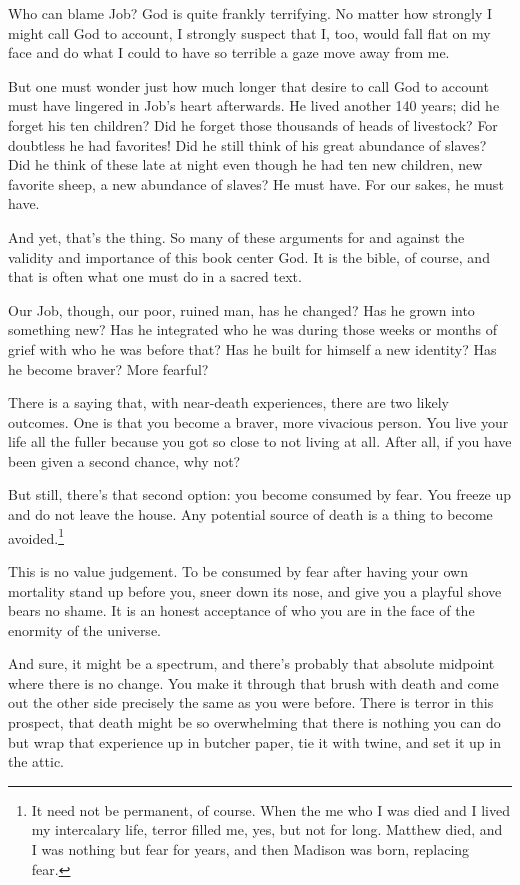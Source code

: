 Who can blame Job? God is quite frankly terrifying. No matter how strongly I might call God to account, I strongly suspect that I, too, would fall flat on my face and do what I could to have so terrible a gaze move away from me.

But one must wonder just how much longer that desire to call God to account must have lingered in Job's heart afterwards. He lived another 140 years; did he forget his ten children? Did he forget those thousands of heads of livestock? For doubtless he had favorites! Did he still think of his great abundance of slaves? Did he think of these late at night even though he had ten new children, new favorite sheep, a new abundance of slaves? He must have. For our sakes, he must have.

And yet, that's the thing. So many of these arguments for and against the validity and importance of this book center God. It is the bible, of course, and that is often what one must do in a sacred text.

Our Job, though, our poor, ruined man, has he changed? Has he grown into something new? Has he integrated who he was during those weeks or months of grief with who he was before that? Has he built for himself a new identity? Has he become braver? More fearful?

There is a saying that, with near-death experiences, there are two likely outcomes. One is that you become a braver, more vivacious person. You live your life all the fuller because you got so close to not living at all. After all, if you have been given a second chance, why not?

But still, there's that second option: you become consumed by fear. You freeze up and do not leave the house. Any potential source of death is a thing to become avoided.\footnote{It need not be permanent, of course. When the me who I was died and I lived my intercalary life, terror filled me, yes, but not for long. Matthew died, and I was nothing but fear for years, and then Madison was born, replacing fear.}

This is no value judgement. To be consumed by fear after having your own mortality stand up before you, sneer down its nose, and give you a playful shove bears no shame. It is an honest acceptance of who you are in the face of the enormity of the universe.

And sure, it might be a spectrum, and there's probably that absolute midpoint where there is no change. You make it through that brush with death and come out the other side precisely the same as you were before. There is terror in this prospect, that death might be so overwhelming that there is nothing you can do but wrap that experience up in butcher paper, tie it with twine, and set it up in the attic.

